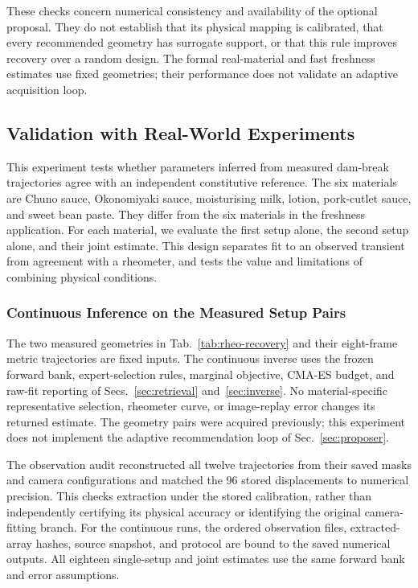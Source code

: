 These checks concern numerical consistency and availability of the
optional proposal. They do not establish that its physical mapping is
calibrated, that every recommended geometry has surrogate support, or
that this rule improves recovery over a random design. The formal
real-material and fast freshness estimates use fixed geometries;
their performance does not validate an adaptive acquisition loop.

\subsection{Validation with Real-World Experiments}
\label{sec:rheometer}

This experiment tests whether parameters inferred from measured dam-break
trajectories agree with an independent constitutive reference. The six
materials are Chuno sauce, Okonomiyaki sauce, moisturising milk, lotion,
pork-cutlet sauce, and sweet bean paste. They differ from the six materials
in the freshness application. For each material, we evaluate the first
setup alone, the second setup alone, and their joint estimate. This design
separates fit to an observed transient from agreement with a rheometer,
and tests the value and limitations of combining physical conditions.

\subsubsection{Continuous Inference on the Measured Setup Pairs}
The two measured geometries in Tab.~\ref{tab:rheo-recovery} and their
eight-frame metric trajectories are fixed inputs. The continuous inverse
uses the frozen forward bank, expert-selection rules, marginal objective,
CMA-ES budget, and raw-fit reporting of Secs.~\ref{sec:retrieval}
and~\ref{sec:inverse}. No material-specific representative selection,
rheometer curve, or image-replay error changes its returned estimate.
The geometry pairs were acquired previously; this experiment does not
implement the adaptive recommendation loop of Sec.~\ref{sec:proposer}.

The observation audit reconstructed all twelve trajectories from their
saved masks and camera configurations and matched the 96 stored
displacements to numerical precision. This checks extraction under the
stored calibration, rather than independently certifying its physical
accuracy or identifying the original camera-fitting branch. For the
continuous runs, the ordered observation files, extracted-array hashes,
source snapshot, and protocol are bound to the saved numerical outputs.
All eighteen single-setup and joint estimates use the same forward bank
and error assumptions.

